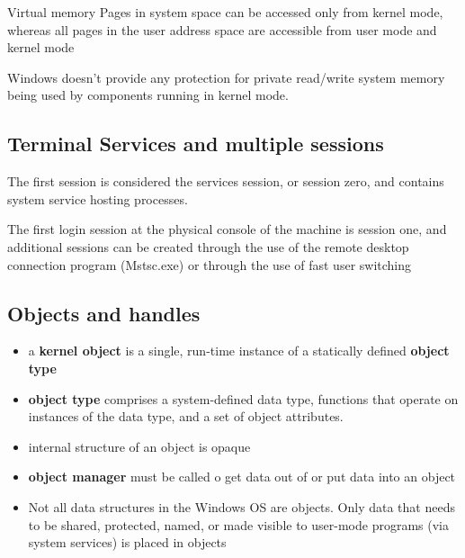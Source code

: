 Virtual memory Pages in system space can be accessed only from kernel mode, whereas all pages in the user address space are accessible from user mode and kernel mode

Windows doesn’t provide any protection for private read/write system memory being used by components running in kernel mode. 


\subsection{Terminal Services and multiple sessions}
The first session is considered the services session, or session zero, and contains system service hosting processes.

The first login session at the physical console of the machine is session one, and additional sessions can be created through the use of the remote desktop connection program (Mstsc.exe) or through the use of fast user switching


\subsection{Objects and handles}

\begin{itemize}
    \item a {\bf kernel object} is a single, run-time instance of a statically defined {\bf object type}
    \item {\bf object type} comprises a system-defined data type, functions that operate on instances of the data type, and a set of object attributes.
    \item internal structure of an object is opaque
    \item {\bf object manager} must be called o get data out of or put data into an object
    \item Not all data structures in the Windows OS are objects. Only data that needs to be shared, protected, named, or made visible to user-mode programs (via system services) is placed in objects
\end{itemize}